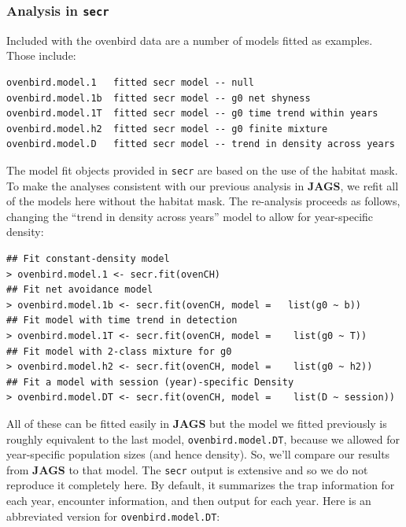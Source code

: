 \subsubsection{Analysis in \mbox{\tt secr} }


Included with the ovenbird data are a number of  models fitted as
examples. Those include:
{\small
\begin{verbatim}
ovenbird.model.1   fitted secr model -- null
ovenbird.model.1b  fitted secr model -- g0 net shyness
ovenbird.model.1T  fitted secr model -- g0 time trend within years
ovenbird.model.h2  fitted secr model -- g0 finite mixture
ovenbird.model.D   fitted secr model -- trend in density across years
\end{verbatim}
}
The model fit objects provided in \mbox{\tt secr} are based on the use
of the habitat mask.
To make the analyses consistent with our previous analysis in {\bf
  JAGS}, we 
refit all of the models here without the habitat mask.
The re-analysis proceeds as follows, changing the ``trend in density
across years'' model to allow for year-specific density:
{\small
\begin{verbatim}
## Fit constant-density model
> ovenbird.model.1 <- secr.fit(ovenCH)
## Fit net avoidance model
> ovenbird.model.1b <- secr.fit(ovenCH, model =   list(g0 ~ b))
## Fit model with time trend in detection
> ovenbird.model.1T <- secr.fit(ovenCH, model =    list(g0 ~ T))
## Fit model with 2-class mixture for g0
> ovenbird.model.h2 <- secr.fit(ovenCH, model =    list(g0 ~ h2))
## Fit a model with session (year)-specific Density
> ovenbird.model.DT <- secr.fit(ovenCH, model =    list(D ~ session))
\end{verbatim}
}
All of these can be fitted easily in {\bf JAGS} but
the model we fitted previously is roughly equivalent to the last model,
\mbox{\tt ovenbird.model.DT}, because we allowed for year-specific
population sizes (and hence density). So, we'll
compare our results from {\bf JAGS} to that
model.  
The \mbox{\tt secr} 
output is extensive 
and so we
do not reproduce it completely here. By default, it summarizes the
trap information for each year, encounter information, and then output for
each year. Here is an abbreviated version for \mbox{\tt ovenbird.model.DT}:
